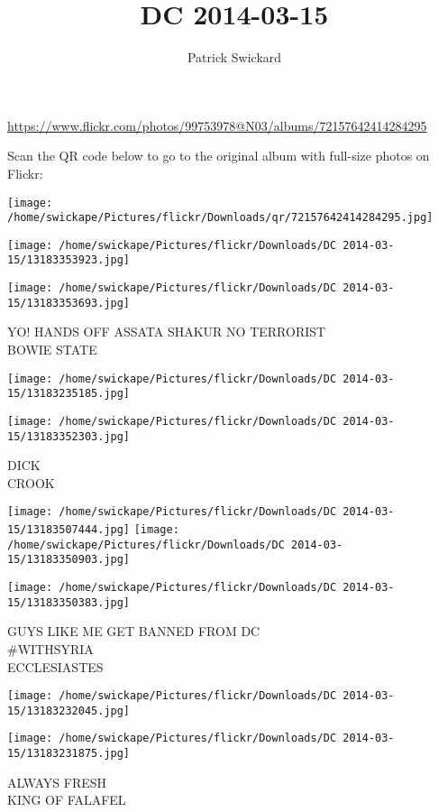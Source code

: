\documentclass[10pt,letterpaper]{article}
\title{DC 2014-03-15}
\author{Patrick Swickard}
\date{}
\begin{document}
\maketitle

\url{https://www.flickr.com/photos/99753978@N03/albums/72157642414284295}

Scan the QR code below to go to the original album with full-size photos on Flickr:

\texttt{[image: /home/swickape/Pictures/flickr/Downloads/qr/72157642414284295.jpg]}
\pagebreak

\texttt{[image: /home/swickape/Pictures/flickr/Downloads/DC 2014-03-15/13183353923.jpg]}

\vspace{0.25in}
\texttt{[image: /home/swickape/Pictures/flickr/Downloads/DC 2014-03-15/13183353693.jpg]}

YO!  HANDS OFF ASSATA SHAKUR NO TERRORIST\\
BOWIE STATE
\pagebreak

\texttt{[image: /home/swickape/Pictures/flickr/Downloads/DC 2014-03-15/13183235185.jpg]}

\vspace{0.25in}
\texttt{[image: /home/swickape/Pictures/flickr/Downloads/DC 2014-03-15/13183352303.jpg]}

DICK\\
CROOK
\pagebreak

\texttt{[image: /home/swickape/Pictures/flickr/Downloads/DC 2014-03-15/13183507444.jpg]}
\texttt{[image: /home/swickape/Pictures/flickr/Downloads/DC 2014-03-15/13183350903.jpg]}

\texttt{[image: /home/swickape/Pictures/flickr/Downloads/DC 2014-03-15/13183350383.jpg]}

GUYS LIKE ME GET BANNED FROM DC\\
\#WITHSYRIA\\
ECCLESIASTES
\pagebreak

\texttt{[image: /home/swickape/Pictures/flickr/Downloads/DC 2014-03-15/13183232045.jpg]}

\vspace{0.25in}
\texttt{[image: /home/swickape/Pictures/flickr/Downloads/DC 2014-03-15/13183231875.jpg]}

ALWAYS FRESH\\
KING OF FALAFEL
\pagebreak
\end{document}
